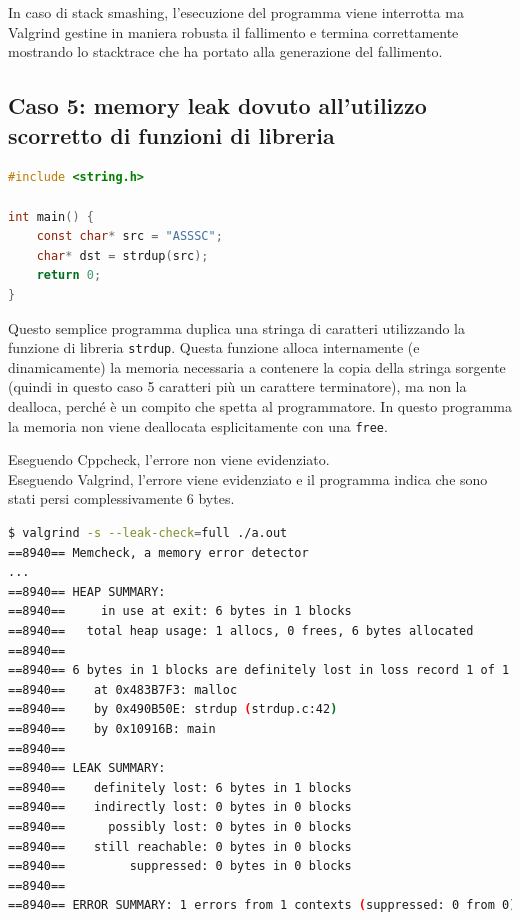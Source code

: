 \documentclass{article}
\begin{document}
In caso di stack smashing, l'esecuzione del programma viene interrotta ma
Valgrind gestine in maniera robusta il fallimento e termina correttamente
mostrando lo stacktrace che ha portato alla generazione del fallimento.

\newpage
\subsection{Caso 5: memory leak dovuto all'utilizzo scorretto di funzioni di libreria}
\label{sec:caso5}

\begin{lstlisting}[language=c]
#include <string.h>

int main() {
    const char* src = "ASSSC";
    char* dst = strdup(src);
    return 0;
}
\end{lstlisting}

Questo semplice programma duplica una stringa di caratteri utilizzando la
funzione di libreria \texttt{strdup}. Questa funzione alloca internamente (e dinamicamente) la
memoria necessaria a contenere la copia della stringa sorgente (quindi in questo
caso 5 caratteri più un carattere terminatore), ma non la dealloca, perché è un
compito che spetta al programmatore. In questo programma la memoria non viene
deallocata esplicitamente con una \texttt{free}.

Eseguendo Cppcheck, l'errore non viene evidenziato. \\

Eseguendo Valgrind, l'errore viene evidenziato e il programma indica che sono
stati persi complessivamente 6 bytes.

\begin{lstlisting}[language=bash]
$ valgrind -s --leak-check=full ./a.out 
==8940== Memcheck, a memory error detector
...
==8940== HEAP SUMMARY:
==8940==     in use at exit: 6 bytes in 1 blocks
==8940==   total heap usage: 1 allocs, 0 frees, 6 bytes allocated
==8940== 
==8940== 6 bytes in 1 blocks are definitely lost in loss record 1 of 1
==8940==    at 0x483B7F3: malloc 
==8940==    by 0x490B50E: strdup (strdup.c:42)
==8940==    by 0x10916B: main 
==8940== 
==8940== LEAK SUMMARY:
==8940==    definitely lost: 6 bytes in 1 blocks
==8940==    indirectly lost: 0 bytes in 0 blocks
==8940==      possibly lost: 0 bytes in 0 blocks
==8940==    still reachable: 0 bytes in 0 blocks
==8940==         suppressed: 0 bytes in 0 blocks
==8940== 
==8940== ERROR SUMMARY: 1 errors from 1 contexts (suppressed: 0 from 0)
\end{lstlisting}
\end{document}
